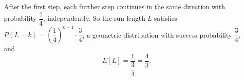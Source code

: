 After the first step, each further step continues in the same direction with probability $\dfrac14$, independently. So the run length $L$ satisfies $P(L=k)=\left(\dfrac14\right)^{k-1}\cdot\dfrac34$, a geometric distribution with success probability $\dfrac34$, and
\[E[L]=\dfrac{1}{\dfrac34}=\boxed{\dfrac43}.\]
